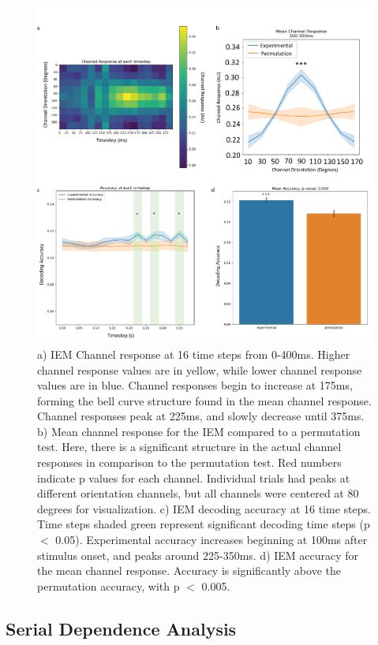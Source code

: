 \documentclass[../main.tex]{subfiles}
\begin{document}
\begin{figure}
    \centering
    \includegraphics[scale=0.175]{figures/results/iem_results.png}
    \caption{a) IEM Channel response at 16 time steps from 0-400ms. Higher channel response values are in yellow, while lower channel response values are in blue. Channel responses begin to increase at 175ms, forming the bell curve structure found in the mean channel response. Channel responses peak at 225ms, and slowly decrease until 375ms. b) Mean channel response for the IEM compared to a permutation test. Here, there is a significant structure in the actual channel responses in comparison to the permutation test. Red numbers indicate p values for each channel. Individual trials had peaks at different orientation channels, but all channels were centered at 80 degrees for visualization. c) IEM decoding accuracy at 16 time steps. Time steps shaded green represent significant decoding time steps (p $<$ 0.05). Experimental accuracy increases beginning at 100ms after stimulus onset, and peaks around 225-350ms. d) IEM accuracy for the mean channel response. Accuracy is significantly above the permutation accuracy, with p $<$ 0.005.}
    \label{iem_results}
\end{figure}

\subsection{Serial Dependence Analysis}
\end{document}
